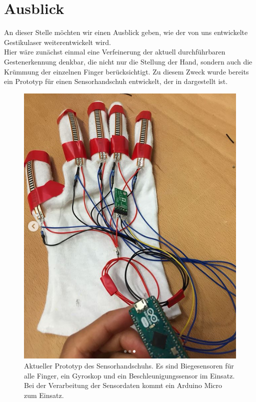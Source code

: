 \chapter{Ausblick}
\label{ch:Ausblick}

An dieser Stelle möchten wir einen Ausblick geben, wie der von uns entwickelte Gestikulaser  weiterentwickelt wird. \\
Hier wäre zunächst einmal eine Verfeinerung der aktuell durchführbaren Gestenerkennung denkbar, die nicht nur die Stellung der Hand, sondern auch die Krümmung der einzelnen Finger berücksichtigt. Zu diesem Zweck wurde bereits ein Prototyp für einen Sensorhandschuh entwickelt, der in  dargestellt ist.
\begin{figure}[H]
	\centering
	\includegraphics[scale=0.75]{../figures/Sensorhandschuh}
	\caption{Aktueller Prototyp des Sensorhandschuhs. Es sind Biegesensoren für alle Finger, ein Gyroskop und ein Beschleunigungssensor im Einsatz. Bei der  
	Verarbeitung der Sensordaten kommt ein Arduino Micro zum Einsatz.}
	\label{fig:Sensorhandschuh}
\end{figure}
\noindent

